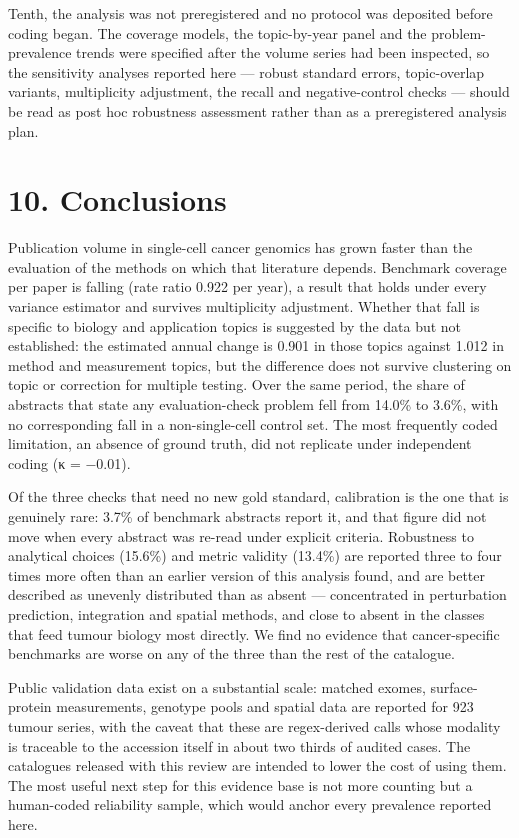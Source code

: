\documentclass[11pt]{article}
\begin{document}
Tenth, the analysis was not preregistered and no protocol was deposited
before coding began. The coverage models, the topic-by-year panel and
the problem-prevalence trends were specified after the volume series had
been inspected, so the sensitivity analyses reported here --- robust
standard errors, topic-overlap variants, multiplicity adjustment, the
recall and negative-control checks --- should be read as post hoc
robustness assessment rather than as a preregistered analysis plan.

\section{10. Conclusions}\label{conclusions}

Publication volume in single-cell cancer genomics has grown faster than
the evaluation of the methods on which that literature depends.
Benchmark coverage per paper is falling (rate ratio 0.922 per year), a
result that holds under every variance estimator and survives
multiplicity adjustment. Whether that fall is specific to biology and
application topics is suggested by the data but not established: the
estimated annual change is 0.901 in those topics against 1.012 in method
and measurement topics, but the difference does not survive clustering
on topic or correction for multiple testing. Over the same period, the
share of abstracts that state any evaluation-check problem fell from
14.0\% to 3.6\%, with no corresponding fall in a non-single-cell control
set. The most frequently coded limitation, an absence of ground truth,
did not replicate under independent coding (κ = −0.01).

Of the three checks that need no new gold standard, calibration is the
one that is genuinely rare: 3.7\% of benchmark abstracts report it, and
that figure did not move when every abstract was re-read under explicit
criteria. Robustness to analytical choices (15.6\%) and metric validity
(13.4\%) are reported three to four times more often than an earlier
version of this analysis found, and are better described as unevenly
distributed than as absent --- concentrated in perturbation prediction,
integration and spatial methods, and close to absent in the classes that
feed tumour biology most directly. We find no evidence that
cancer-specific benchmarks are worse on any of the three than the rest
of the catalogue.

Public validation data exist on a substantial scale: matched exomes,
surface-protein measurements, genotype pools and spatial data are
reported for 923 tumour series, with the caveat that these are
regex-derived calls whose modality is traceable to the accession itself
in about two thirds of audited cases. The catalogues released with this
review are intended to lower the cost of using them. The most useful
next step for this evidence base is not more counting but a human-coded
reliability sample, which would anchor every prevalence reported here.
\end{document}
